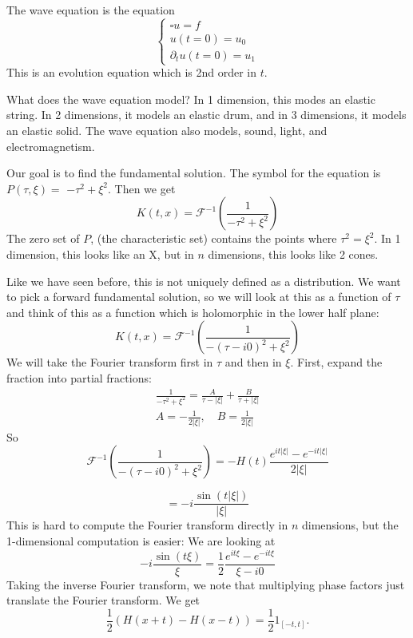 \begin{definition}
    The wave equation is the equation
$$
\left\{\begin{array}{l}
\square u=f \\
u(t=0)=u_{0} \\
\partial_{t} u(t=0)=u_{1}
\end{array}\right.
$$
This is an evolution equation which is 2nd order in $t$.
\end{definition}

What does the wave equation model? In 1 dimension, this modes an elastic string. In 2 dimensions, it models an elastic drum, and in 3 dimensions, it models an elastic solid. The wave equation also models, sound, light, and electromagnetism.

Our goal is to find the fundamental solution. The symbol for the equation is $P(\tau, \xi)=$ $-\tau^{2}+\xi^{2}$. Then we get
$$
K(t, x)={\mathcal{F}}^{-1}\left(\frac{1}{-\tau^{2}+\xi^{2}}\right)
$$
The zero set of $P$, (the characteristic set) contains the points where $\tau^{2}=\xi^{2}$. In 1 dimension, this looks like an $\mathrm{X}$, but in $n$ dimensions, this looks like 2 cones.

Like we have seen before, this is not uniquely defined as a distribution. We want to pick a forward fundamental solution, so we will look at this as a function of $\tau$ and think of this as a function which is holomorphic in the lower half plane:
$$
K(t, x)=\mathcal{F}^{-1}\left(\frac{1}{-(\tau-i 0)^{2}+\xi^{2}}\right)
$$
We will take the Fourier transform first in $\tau$ and then in $\xi .$ First, expand the fraction into partial fractions:
$$
\begin{gathered}
\frac{1}{-\tau^{2}+\xi^{2}}=\frac{A}{\tau-|\xi|}+\frac{B}{\tau+|\xi|} \\
A=-\frac{1}{2|\xi|}, \quad B=\frac{1}{2|\xi|}
\end{gathered}
$$
So
$$
\mathcal{F}^{-1}\left(\frac{1}{-(\tau-i 0)^{2}+\xi^{2}}\right)=-H(t) \frac{e^{i t|\xi|}-e^{-i t|\xi|}}{2|\xi|}
$$

$$
=-i \frac{\sin (t|\xi|)}{|\xi|}
$$
This is hard to compute the Fourier transform directly in $n$ dimensions, but the 1-dimensional computation is easier: We are looking at
$$
-i \frac{\sin (t \xi)}{\xi}=\frac{1}{2} \frac{e^{i t \xi}-e^{-i t \xi}}{\xi-i 0}
$$
Taking the inverse Fourier transform, we note that multiplying phase factors just translate the Fourier transform. We get
$$
\frac{1}{2}(H(x+t)-H(x-t))=\frac{1}{2} 1_{[-t, t]} .
$$

